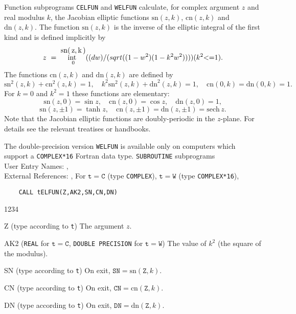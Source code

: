                        
                  
               
                      
Function subprograms {\tt CELFUN} and {\tt WELFUN} calculate, for complex
argument $z$ and real modulus $k$, the Jacobian elliptic functions
$\mathrm{sn}(z,k)$, $\mathrm{cn}(z,k)$ and $\mathrm{dn}(z,k)$.
The function $\mathrm{sn}(z,k)$ is the inverse of the elliptic
integral of the first kind and is defined implicitly by
$$ z \ = \ \displaystyle \int_0^{\mbox{\small sn(\,{\it z,\,k}\,)}}
\frac{dw}{\sqrt{(1-w^2)(1-k^2w^2)}} \qquad (k^2 \leq 1). $$
The functions $\mathrm{cn}(z,k)$ and $\mathrm{dn}(z,k)$ are defined by
$$ \mathrm{sn}^2(z,k) + \mathrm{cn}^2(z,k) = 1, \quad
k^2 \mathrm{sn}^2(z,k) + \mathrm{dn}^2(z,k) = 1, \quad
\mathrm{cn}(0,k) = \mathrm{dn}(0,k) = 1. $$
For $k = 0$ and $k^2 = 1$ these functions are elementary:
$$ \mathrm{sn}(z,0) = \sin z, \quad
\mathrm{cn}(z,0) = \cos z, \quad \mathrm{dn}(z,0) = 1,$$
$$ \mathrm{sn}(z,\pm 1) = \tanh z, \quad
\mathrm{cn}(z,\pm 1) = \mathrm{dn}(z,\pm 1) = \mathrm{sech}\, z.$$
Note that the Jacobian elliptic functions are doubly-periodic in the
$z$-plane. For details see the relevant treatises or handbooks.
\par
The double-precision version {\tt WELFUN} is available only on computers
which support a {\tt COMPLEX*16} Fortran data type.
\Structure
{\tt SUBROUTINE} subprograms \\
User Entry Names: ,  \\
External References: , 
\Usage
For $\mathtt{t=C}$ (type {\tt COMPLEX}), $\mathtt{t=W}$ (type
{\tt COMPLEX*16}),
\begin{verbatim}
    CALL tELFUN(Z,AK2,SN,CN,DN)
\end{verbatim}
\begin{DLtt}{1234}
\item[Z] (type according to {\tt t}) The argument $z$.
\item[AK2] ({\tt REAL} for $\mathtt{t=C}$, {\tt DOUBLE PRECISION}
for $\mathtt{t=W}$)
The value of $k^2$ (the square of the modulus).
\item[SN] (type according to {\tt t}) On exit,
$\mathtt{SN}=\mathrm{sn}(\mathtt{Z},k)$.
\item[CN] (type according to {\tt t}) On exit,
$\mathtt{CN}=\mathrm{cn}(\mathtt{Z},k)$.
\item[DN] (type according to {\tt t}) On exit,
$\mathtt{DN}=\mathrm{dn}(\mathtt{Z},k)$.
\end{DLtt}
